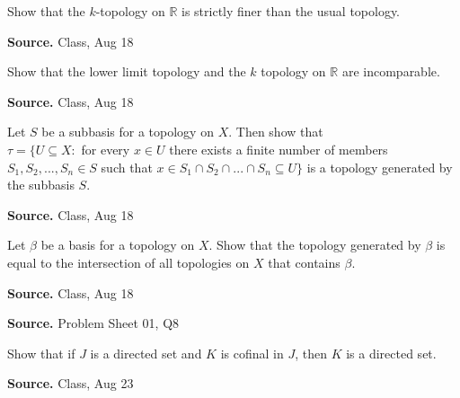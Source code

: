 \documentclass[12pt,twoside]{report}
\newenvironment*{source}{\hfill\scriptsize\textbf{Source.}\space}{\par}
\begin{document}
\begin{samepage}
\begin{ex}
Show that the $k$-topology on $\mathbb{R}$ is strictly finer than the usual topology.
\end{ex}
\begin{source}
Class, Aug 18
\end{source}
\end{samepage}

\begin{samepage}
\begin{ex}
Show that the lower limit topology and the $k$ topology on $\mathbb{R}$ are incomparable.
\end{ex}
\begin{source}
Class, Aug 18
\end{source}
\end{samepage}

\begin{samepage}
\begin{ex}
Let $S$ be a subbasis for a topology on $X$. Then show that 
\\ $\tau = \{ U \subseteq X  :  $ for every $ x \in U $ there exists a finite number of members $ S_1, S_2, ..., S_n \in S $ such that $ x \in S_1 \cap S_2 \cap ... \cap S_n \subseteq U \}$ is a topology generated by the subbasis $S$.
\end{ex}
\begin{source}
Class, Aug 18
\end{source}
\end{samepage}

\begin{samepage}
\begin{ex}
Let $\beta$ be a basis for a topology on $X$. Show that the topology generated by $\beta$ is equal to the intersection of all topologies on $X$ that contains $\beta$.
\end{ex}
\begin{source}
Class, Aug 18
\end{source}
\end{samepage}

\begin{samepage}
\begin{ex}
\end{ex}
\begin{source}
Problem Sheet 01, Q8
\end{source}
\end{samepage}

\begin{samepage}
\begin{ex}
Show that if $J$ is a directed set and $K$ is cofinal in $J$, then $K$ is a directed set.
\end{ex}
\begin{source}
Class, Aug 23
\end{source}
\end{samepage}
\end{document}

